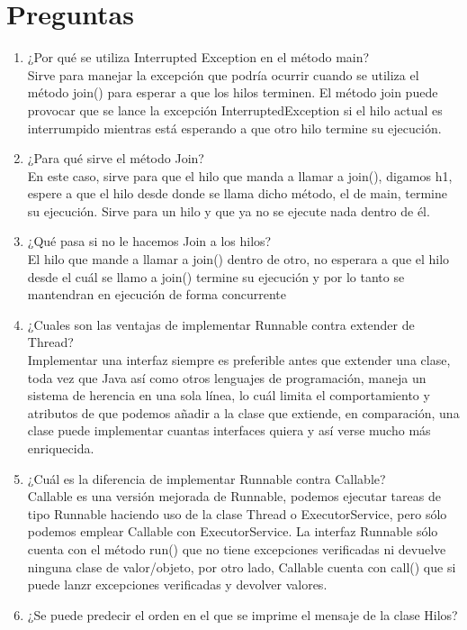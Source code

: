 \documentclass{article}
\begin{document}
\section*{Preguntas}
\begin{enumerate}
    \item ¿Por qué se utiliza Interrupted Exception en el método main? \\
    Sirve para manejar la excepción que podría ocurrir cuando se utiliza el método join() para esperar a que los hilos terminen.
    El método join puede provocar que se lance la excepción InterruptedException si el hilo actual es interrumpido mientras está esperando a que otro hilo termine su ejecución. 
    \item ¿Para qué sirve el método Join? \\
    En este caso, sirve para que el hilo que manda a llamar a join(), digamos h1, espere a que el hilo desde donde se llama dicho método, el de main, termine su ejecución. Sirve para  un hilo y que ya no se ejecute nada dentro de él.
    \item ¿Qué pasa si no le hacemos Join a los hilos?\\
    El hilo que mande a llamar a join() dentro de otro, no esperara a que el hilo desde el cuál se llamo a join() termine su ejecución y por lo tanto se mantendran en ejecución de forma concurrente
    \item ¿Cuales son las ventajas de implementar Runnable contra   extender de Thread? \\
    Implementar una interfaz siempre es preferible antes que extender una clase, toda vez que Java así como otros lenguajes de programación, maneja un sistema de herencia en una sola línea, lo cuál limita el comportamiento y atributos de que podemos añadir a la clase que extiende, en comparación, una clase puede implementar cuantas interfaces quiera y así verse mucho más enriquecida.
    \item ¿Cuál es la diferencia de implementar Runnable contra Callable?\\
    Callable es una versión mejorada de Runnable, podemos ejecutar tareas de tipo Runnable haciendo uso de la clase Thread o ExecutorService, pero sólo podemos emplear Callable con ExecutorService. La interfaz Runnable sólo cuenta con el método run() que no tiene excepciones verificadas ni devuelve ninguna clase de valor/objeto, por otro lado, Callable cuenta con call() que si puede lanzr excepciones verificadas y devolver valores.
    \item ¿Se puede predecir el orden en el que se imprime el mensaje de la clase Hilos?\\

\end{enumerate}
\end{document}
